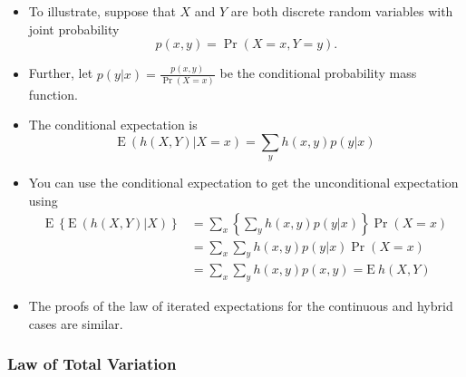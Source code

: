 \documentclass[]{book}
\begin{document}
\begin{itemize}
\item
  To illustrate, suppose that \(X\) and \(Y\) are both discrete random
  variables with joint probability \[p(x,y) = \Pr(X=x, Y=y).\]
\item
  Further, let \(p(y|x) = \frac{p(x,y)}{\Pr(X=x)}\) be the conditional
  probability mass function.
\item
  The conditional expectation is
  \[\mathrm{E~} \left( h(X,Y) | X=x \right) = \sum_y h(x,y) p(y|x)\]
\item
  You can use the conditional expectation to get the unconditional
  expectation using \[\begin{aligned}
   \mathrm{E~} \left\{ \mathrm{E~} \left( h(X,Y) | X \right) \right \}
  &= \sum_x  \left\{\sum_y h(x,y) p(y|x) \right \} \Pr(X=x) \\
  &= \sum_x  \sum_y h(x,y) p(y|x)  \Pr(X=x) \\
  &=  \sum_x  \sum_y h(x,y) p(x,y)
  =  \mathrm{E~} h(X,Y)\end{aligned}\]
\item
  The proofs of the law of iterated expectations for the continuous and
  hybrid cases are similar.
\end{itemize}

\subsubsection{Law of Total Variation}\label{law-of-total-variation}
\end{document}
